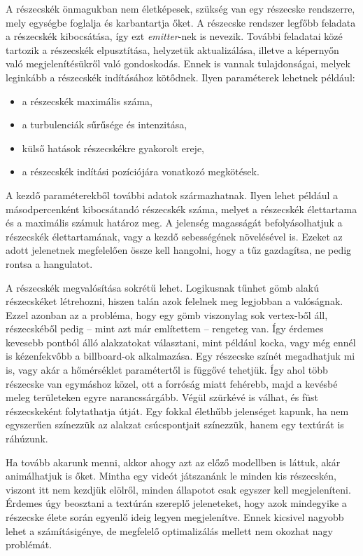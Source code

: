 A részecskék önmagukban nem életképesek, szükség van egy részecske rendszerre, mely egységbe foglalja és karbantartja őket. A részecske rendszer legfőbb feladata a részecskék kibocsátása, így ezt \textit{emitter}-nek is nevezik. További feladatai közé tartozik a részecskék elpusztítása, helyzetük aktualizálása, illetve a képernyőn való megjelenítésükről való gondoskodás. Ennek is vannak tulajdonságai, melyek leginkább a részecskék indításához kötődnek. Ilyen paraméterek lehetnek például:
\begin{itemize}
\item a részecskék maximális száma, 
\item a turbulenciák sűrűsége és intenzitása, 
\item külső hatások részecskékre gyakorolt ereje, 
\item a részecskék indítási pozíciójára vonatkozó megkötések.
\end{itemize}

A kezdő paraméterekből további adatok származhatnak. Ilyen lehet például a másodpercenként kibocsátandó részecskék száma, melyet a részecskék élettartama és a maximális számuk határoz meg. A jelenség magasságát befolyásolhatjuk a részecskék élettartamának, vagy a kezdő sebességének növelésével is. Ezeket az adott jelenetnek megfelelően össze kell hangolni, hogy a tűz gazdagítsa, ne pedig rontsa a hangulatot.

A részecskék megvalósítása sokrétű lehet. Logikusnak tűnhet gömb alakú részecskéket létrehozni, hiszen talán azok felelnek meg legjobban  a valóságnak. Ezzel azonban az a probléma, hogy egy gömb viszonylag sok vertex-ből áll, részecskéből pedig -- mint azt már említettem -- rengeteg van. Így érdemes kevesebb pontból álló alakzatokat választani, mint például kocka, vagy még ennél is kézenfekvőbb a billboard-ok alkalmazása. Egy részecske színét megadhatjuk mi is, vagy akár a hőmérséklet paramétertől is függővé tehetjük. Így ahol több részecske van egymáshoz közel, ott a forróság miatt fehérebb, majd a kevésbé meleg területeken egyre narancssárgább. Végül szürkévé is válhat, és füst részecskeként folytathatja útját. Egy fokkal élethűbb jelenséget kapunk, ha nem egyszerűen színezzük az alakzat csúcspontjait színezzük, hanem egy textúrát is ráhúzunk.

Ha tovább akarunk menni, akkor ahogy azt az előző modellben is láttuk, akár animálhatjuk is őket. Mintha egy videót játszanánk le minden kis részecskén, viszont itt nem kezdjük elölről, minden állapotot csak egyszer kell megjeleníteni. Érdemes úgy beosztani a textúrán szereplő jeleneteket, hogy azok mindegyike a részecske élete során egyenlő ideig legyen megjelenítve. Ennek kicsivel nagyobb lehet a számításigénye, de megfelelő optimalizálás mellett nem okozhat nagy problémát. 

